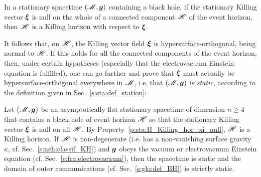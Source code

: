 \begin{prop}
\label{p:sta:H_Killing_hor_xi_null}
In a stationary spacetime $(\mathscr{M},\bm{g})$ containing a black hole,
if the stationary Killing vector $\bm{\xi}$
is null on the whole of a connected component $\mathscr{H}$ of the event horizon, then $\mathscr{H}$ is a Killing horizon with respect to $\bm{\xi}$.
\end{prop}

It follows that, on $\mathscr{H}$, the Killing vector field $\bm{\xi}$
is hypersurface-orthogonal, being normal to $\mathscr{H}$.
If this holds for all the connected components of the event horizon, then,
under certain hypotheses (especially
that the electrovacuum Einstein equation is fulfilled), one can go further
and prove that $\bm{\xi}$ must actually be hypersurface-orthogonal everywhere in $\mathscr{M}$,
i.e. that $(\mathscr{M},\bm{g})$ is \emph{static}, according to the definition given in Sec.~\ref{s:sta:def_station}:

\begin{prop}
\label{p:sta:staticity_thm}
Let $(\mathscr{M},\bm{g})$ be an asymptotically flat stationary spacetime of dimension $n\geq 4$
that contains a black hole of event horizon $\mathscr{H}$ so that
the stationary Killing vector $\bm{\xi}$ is null on all $\mathscr{H}$. By Property~\ref{p:sta:H_Killing_hor_xi_null}, $\mathscr{H}$ is a Killing horizon. If $\mathscr{H}$ is
non-degenerate (i.e. has a non-vanishing surface gravity $\kappa$, cf. Sec.~\ref{s:neh:classif_KH})
and $\bm{g}$ obeys the vacuum or electrovacuum Einstein equation (cf. Sec.~\ref{e:fra:electrovacuum}),
then the spacetime
is static and the domain of outer communications (cf. Sec.~\ref{s:glo:def_BH}) is strictly static.
\end{prop}

